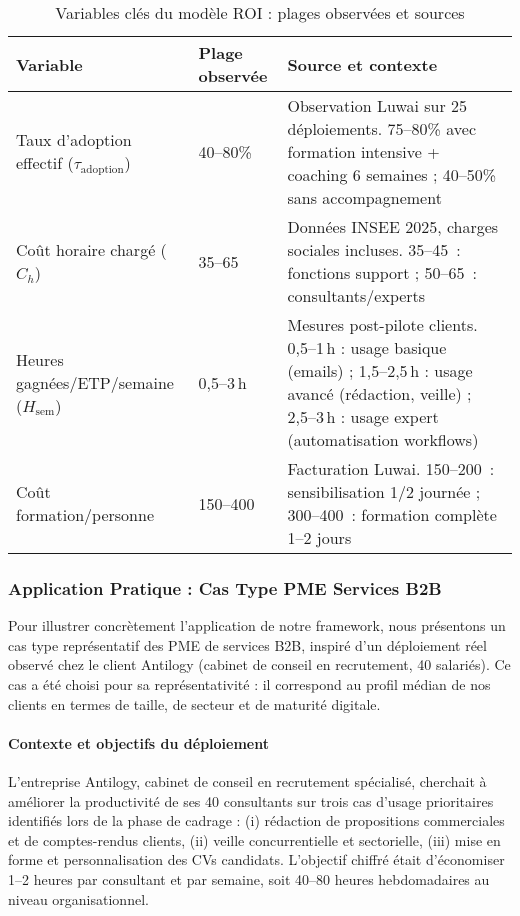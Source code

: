 \begin{table}[ht]
\centering
\caption{Variables clés du modèle ROI : plages observées et sources}
\label{tab:roi_variables}
\begin{tabular}{@{}p{4cm}p{3.5cm}p{7cm}@{}}
\toprule
\textbf{Variable} & \textbf{Plage observée} & \textbf{Source et contexte} \\
\midrule
Taux d'adoption effectif ($\tau_{\text{adoption}}$) & 40--80\% & Observation Luwai sur 25 déploiements. 75--80\% avec formation intensive + coaching 6 semaines ; 40--50\% sans accompagnement \\
\midrule
Coût horaire chargé ($C_h$) & 35--65\,\texteuro{} & Données INSEE 2025, charges sociales incluses. 35--45\,\texteuro{} : fonctions support ; 50--65\,\texteuro{} : consultants/experts \\
\midrule
Heures gagnées/ETP/semaine ($H_{\text{sem}}$) & 0{,}5--3\,h & Mesures post-pilote clients. 0{,}5--1\,h : usage basique (emails) ; 1{,}5--2{,}5\,h : usage avancé (rédaction, veille) ; 2{,}5--3\,h : usage expert (automatisation workflows) \\
\midrule
Coût formation/personne & 150--400\,\texteuro{} & Facturation Luwai. 150--200\,\texteuro{} : sensibilisation 1/2 journée ; 300--400\,\texteuro{} : formation complète 1--2 jours \\
\bottomrule
\end{tabular}
\end{table}

\subsubsection{Application Pratique : Cas Type PME Services B2B}

Pour illustrer concrètement l'application de notre framework, nous présentons un cas type représentatif des PME de services B2B, inspiré d'un déploiement réel observé chez le client Antilogy (cabinet de conseil en recrutement, 40 salariés). Ce cas a été choisi pour sa représentativité : il correspond au profil médian de nos clients en termes de taille, de secteur et de maturité digitale.

\paragraph{Contexte et objectifs du déploiement}

L'entreprise Antilogy, cabinet de conseil en recrutement spécialisé, cherchait à améliorer la productivité de ses 40 consultants sur trois cas d'usage prioritaires identifiés lors de la phase de cadrage : (i) rédaction de propositions commerciales et de comptes-rendus clients, (ii) veille concurrentielle et sectorielle, (iii) mise en forme et personnalisation des CVs candidats. L'objectif chiffré était d'économiser 1--2 heures par consultant et par semaine, soit 40--80 heures hebdomadaires au niveau organisationnel.

